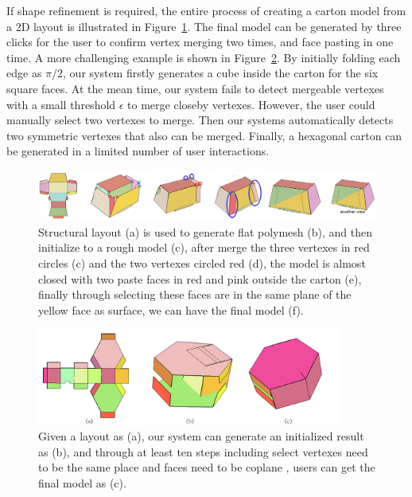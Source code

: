 If shape refinement is required, the entire process of creating a carton model from a 2D layout is illustrated in Figure~\ref{fig:result}.
The final model can be generated by three clicks for the user to confirm vertex merging two times, and face pasting in one time. 
%
A more challenging example is shown in Figure~\ref{fig:hexagon}. 
By initially folding each edge as $\pi/2$, our system firstly generates a cube inside the carton for the six square faces. 
At the mean time, our system fails to detect mergeable vertexes with a small threshold $\epsilon$ to merge closeby vertexes.
%
However, the user could manually select two vertexes  to merge. Then our systems automatically detects two symmetric vertexes that also can be merged. 
%
Finally, a hexagonal carton can be generated in a limited number of user interactions.




\begin{figure}
	\centering
	\includegraphics[width=\textwidth]{images/prismprocess.png}
	\caption{Structural layout (a) is used to generate flat polymesh (b), and then initialize to a rough model (c), after merge the three vertexes in red circles (c) and the two vertexes circled red (d), the model is almost closed with two paste faces in red and pink outside the carton (e), finally through selecting these faces are in the same plane of the yellow face as surface, we can have the final model (f).}
	\label{fig:result}
\end{figure}




\begin{figure}
	\centering
	\includegraphics[width=0.9\textwidth]{images/limitation.jpg}
	\caption{Given a layout as (a), our system can generate an initialized result as (b), and through at least ten steps including select vertexes need to be the same place and faces need to be coplane , users can get the final model as (c). }
	\label{fig:hexagon}
\end{figure}




